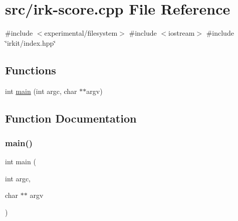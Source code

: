 \hypertarget{irk-score_8cpp}{}\section{src/irk-\/score.cpp File Reference}
\label{irk-score_8cpp}
{\ttfamily \#include $<$experimental/filesystem$>$}\newline
{\ttfamily \#include $<$iostream$>$}\newline
{\ttfamily \#include \char`\"{}irkit/index.\+hpp\char`\"{}}\newline
\subsection*{Functions}
\begin{DoxyCompactItemize}
\item 
int \mbox{\hyperlink{irk-score_8cpp_a3c04138a5bfe5d72780bb7e82a18e627}{main}} (int argc, char $\ast$$\ast$argv)
\end{DoxyCompactItemize}


\subsection{Function Documentation}
\mbox{\label{irk-score_8cpp_a3c04138a5bfe5d72780bb7e82a18e627}} 
\subsubsection{\texorpdfstring{main()}{main()}}
{\footnotesize\ttfamily int main (\begin{DoxyParamCaption}\item[{int}]{argc,  }\item[{char $\ast$$\ast$}]{argv }\end{DoxyParamCaption})}

